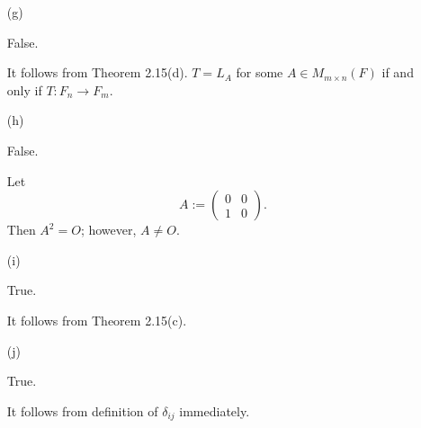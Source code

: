 \begin{Exercise}
\begin{enumerate}[(a)]
\item[(g)]
\begin{answer}
False.
\end{answer}
\begin{solution}
It follows from Theorem 2.15(d). $T = L_A$ for some $A\in M_{m\times n}(F)$ if and only if  $T:F_n\to F_m$.
\end{solution}

\item[(h)]
\begin{answer}
False.
\end{answer}
\begin{solution}
Let
$$
A := \begin{pmatrix}
0 & 0 \\
1 & 0
\end{pmatrix}.
$$
Then $A^2 = O$; however, $A\neq O$.
\end{solution}

\item[(i)]
\begin{answer}
True.
\end{answer}
\begin{solution}
It follows from Theorem 2.15(c).
\end{solution}

\item[(j)]
\begin{answer}
True.
\end{answer}
\begin{solution}
It follows from definition of $\delta_{i j}$ immediately.
\end{solution}

\end{enumerate}
\end{Exercise}